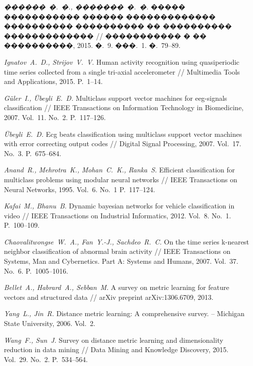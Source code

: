 \documentclass[12pt,twoside, notitlepage]{article}
\begin{document}
\begin{thebibliography}{10}

\emph{������~�.~�., �������~�.~�.}
\newblock ����� ����������� ������ ������������� ���������� ���������� ��
���������� ������������� // ����������� � �� ����������,
2015. �.~9. ���.~1. �.~79--89.

\emph{Ignatov~A.~D., Strijov~V.~V.}
\newblock Human activity recognition using quasiperiodic time series collected
  from a single tri-axial accelerometer // Multimedia Tools and Applications, 2015. P.~1--14.

\emph{G{\"u}ler~I., {\"U}beyli~E.~D.}
\newblock Multiclass support vector machines for eeg-signals classification //
IEEE Transactions on Information Technology in Biomedicine, 2007. Vol.~11. No.~2. P.~117--126.

\emph{{\"U}beyli~E.~D.}
\newblock Ecg beats classification using multiclass support vector machines
  with error correcting output codes // Digital Signal Processing, 2007. Vol.~17. No.~3. P.~675--684.

\emph{Anand~R., Mehrotra~K., Mohan~C.~K., Ranka~S.}
\newblock Efficient classification for multiclass problems using modular neural
  networks // IEEE Transactions on Neural Networks, 1995. Vol.~6. No.~1 P.~117--124.

\emph{Kafai~M., Bhanu~B.}
\newblock Dynamic bayesian networks for vehicle classification in video // IEEE Transactions on Industrial Informatics,
2012. Vol.~8. No.~1. P.~100--109.

\emph{Chaovalitwongse~W.~A., Fan~Y.-J., Sachdeo~R.~C.}
\newblock On the time series k-nearest neighbor classification of abnormal
  brain activity // IEEE Transactions on Systems, Man and Cybernetics. Part A: Systems and Humans,
2007. Vol.~37. No.~6. P.~1005--1016.

\emph{Bellet~A., Habrard~A., Sebban~M.}
\newblock A survey on metric learning for feature vectors and structured data //
arXiv preprint arXiv:1306.6709, 2013.

\emph{Yang~L., Jin~R.}
\newblock Distance metric learning: A comprehensive survey. -- Michigan State University, 2006. Vol.~2.

\emph{Wang~F., Sun~J.}
\newblock Survey on distance metric learning and dimensionality reduction in data mining //
Data Mining and Knowledge Discovery, 2015. Vol.~29. No.~2. P.~534--564.


\end{thebibliography}
\end{document}
